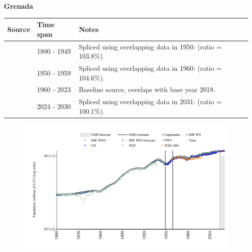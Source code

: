 \documentclass[12pt,a4paper,landscape]{article}
\begin{document}
\begin{adjustbox}{max totalsize={\paperwidth}{\paperheight},center}
\begin{minipage}[t][\textheight][t]{\textwidth}
\vspace*{0.5cm}
{}
\begin{center}
{\Large\bfseries Grenada}
\end{center}
\vspace{0.5cm}
\begin{table}[H]
\centering
\small
\begin{tabular}{|l|l|l|}
\hline
\textbf{Source} & \textbf{Time span} & \textbf{Notes} \\
\hline
\rowcolor{white}\cite{Gapminder}& 1800 - 1949 &Spliced using overlapping data in 1950: (ratio = 103.8\%).\\
\rowcolor{lightgray}\cite{IMF_IFS}& 1950 - 1959 &Spliced using overlapping data in 1960: (ratio = 104.6\%).\\
\rowcolor{white}\cite{WDI}& 1960 - 2023 &Baseline source, overlaps with base year 2018.\\
\rowcolor{lightgray}\cite{Gapminder}& 2024 - 2030 &Spliced using overlapping data in 2031: (ratio = 100.1\%).\\
\hline
\end{tabular}
\end{table}
\begin{figure}[H]
\centering
\includegraphics[width=\textwidth,height=0.6\textheight,keepaspectratio]{graphs/GRD_pop.pdf}
\end{figure}
\end{minipage}
\end{adjustbox}
\end{document}
